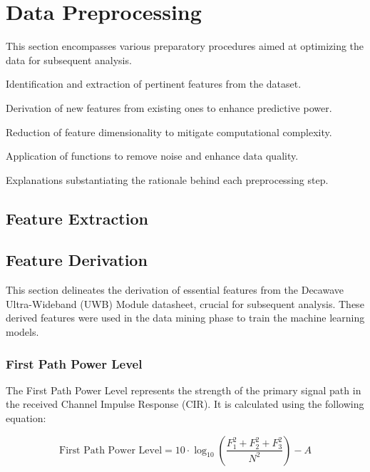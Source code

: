 \section{Data Preprocessing}\label{data_preprocessing}

This section encompasses various preparatory procedures aimed at optimizing the data for subsequent analysis.

\begin{description}[style=nextline]
    \item[Feature Extraction:] Identification and extraction of pertinent features from the dataset.
    \item[Feature Derivation:] Derivation of new features from existing ones to enhance predictive power.
    \item[Feature Reduction:] Reduction of feature dimensionality to mitigate computational complexity.
    \item[De-Noise Functions:] Application of functions to remove noise and enhance data quality.
    \item[Justifications of Processes:] Explanations substantiating the rationale behind each preprocessing step.
\end{description}

\subsection{Feature Extraction}\label{feature_extraction}


\subsection{Feature Derivation}\label{feature_derivation}

This section delineates the derivation of essential features from the Decawave Ultra-Wideband (UWB) Module datasheet, crucial for subsequent analysis. These derived features were used in the data mining phase to train the machine learning models.

\subsubsection{First Path Power Level}\label{first_path_power_level}

The First Path Power Level represents the strength of the primary signal path in the received Channel Impulse Response (CIR). It is calculated using the following equation:

\begin{equation}
  \text{First Path Power Level} = 10 \cdot \log_{10} \left( \frac{F_1^2 + F_2^2 + F_3^2}{N^2} \right) - A
\end{equation}

